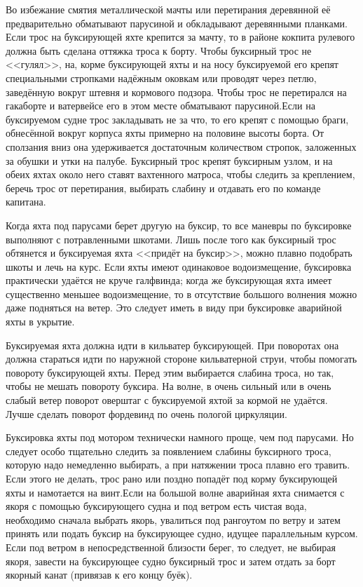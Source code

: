 Во избежание смятия металлической мачты или перетирания деревянной её
предварительно обматывают парусиной и обкладывают деревянными
планками. Если трос на буксирующей яхте крепится за мачту, то в районе
кокпита рулевого должна быть сделана оттяжка троса к борту. Чтобы
буксирный трос не <<гулял>>, на, корме буксирующей яхты и на носу
буксируемой его крепят специальными стропками надёжным оковкам или
проводят через петлю, заведённую вокруг штевня и кормового
подзора. Чтобы трос не перетирался на гакаборте и ватервейсе его в
этом месте обматывают парусиной.Если на буксируемом судне трос
закладывать не за что, то его крепят с помощью браги, обнесённой
вокруг корпуса яхты примерно на половине высоты борта. От сползания
вниз она удерживается достаточным количеством стропок, заложенных за
обушки и утки на палубе. Буксирный трос крепят буксирным узлом, и на
обеих яхтах около него ставят вахтенного матроса, чтобы следить за
креплением, беречь трос от перетирания, выбирать слабину и отдавать
его по команде капитана.

Когда яхта под парусами берет другую на буксир, то все маневры по
буксировке выполняют с потравленными шкотами. Лишь после того как
буксирный трос обтянется и буксируемая яхта <<придёт на буксир>>,
можно плавно подобрать шкоты и лечь на курс. Если яхты имеют
одинаковое водоизмещение, буксировка практически удаётся не круче
галфвинда; когда же буксирующая яхта имеет существенно меньшее
водоизмещение, то в отсутствие большого волнения можно даже подняться
на ветер. Это следует иметь в виду при буксировке аварийной яхты в
укрытие.

Буксируемая яхта должна идти в кильватер буксирующей. При поворотах
она должна стараться идти по наружной стороне кильватерной струи,
чтобы помогать повороту буксирующей яхты. Перед этим выбирается
слабина троса, но так, чтобы не мешать повороту буксира. На волне, в
очень сильный или в очень слабый ветер поворот оверштаг с буксируемой
яхтой за кормой не удаётся. Лучше сделать поворот фордевинд по очень
пологой циркуляции.

Буксировка яхты под мотором технически намного проще, чем под
парусами. Но следует особо тщательно следить за появлением слабины
буксирного троса, которую надо немедленно выбирать, а при натяжении
троса плавно его травить. Если этого не делать, трос рано или поздно
попадёт под корму буксирующей яхты и намотается на винт.Если на
большой волне аварийная яхта снимается с якоря с помощью буксирующего
судна и под ветром есть чистая вода, необходимо сначала выбрать якорь,
увалиться под рангоутом по ветру и затем принять или подать буксир на
буксирующее судно, идущее параллельным курсом. Если под ветром в
непосредственной близости берег, то следует, не выбирая якоря, завести
на буксирующее судно буксирный трос и затем отдать за борт якорный
канат (привязав к его концу буёк).

